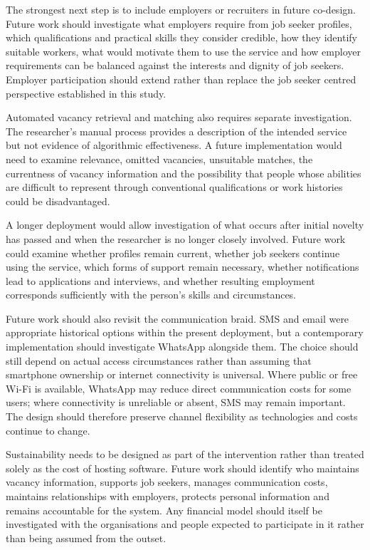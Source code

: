 The strongest next step is to include employers or recruiters in future co-design. Future work should investigate what employers require from job seeker profiles, which qualifications and practical skills they consider credible, how they identify suitable workers, what would motivate them to use the service and how employer requirements can be balanced against the interests and dignity of job seekers. Employer participation should extend rather than replace the job seeker centred perspective established in this study.

Automated vacancy retrieval and matching also requires separate investigation. The researcher's manual process provides a description of the intended service but not evidence of algorithmic effectiveness. A future implementation would need to examine relevance, omitted vacancies, unsuitable matches, the currentness of vacancy information and the possibility that people whose abilities are difficult to represent through conventional qualifications or work histories could be disadvantaged.

A longer deployment would allow investigation of what occurs after initial novelty has passed and when the researcher is no longer closely involved. Future work could examine whether profiles remain current, whether job seekers continue using the service, which forms of support remain necessary, whether notifications lead to applications and interviews, and whether resulting employment corresponds sufficiently with the person's skills and circumstances.

Future work should also revisit the communication braid. SMS and email were appropriate historical options within the present deployment, but a contemporary implementation should investigate WhatsApp alongside them. The choice should still depend on actual access circumstances rather than assuming that smartphone ownership or internet connectivity is universal. Where public or free Wi-Fi is available, WhatsApp may reduce direct communication costs for some users; where connectivity is unreliable or absent, SMS may remain important. The design should therefore preserve channel flexibility as technologies and costs continue to change.

Sustainability needs to be designed as part of the intervention rather than treated solely as the cost of hosting software. Future work should identify who maintains vacancy information, supports job seekers, manages communication costs, maintains relationships with employers, protects personal information and remains accountable for the system. Any financial model should itself be investigated with the organisations and people expected to participate in it rather than being assumed from the outset.

